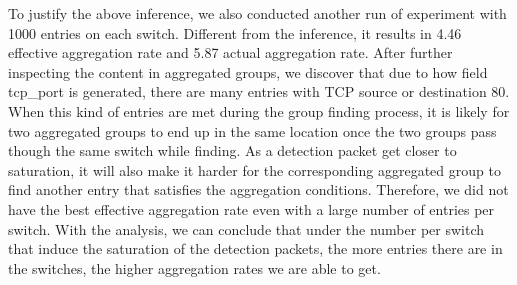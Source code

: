 To justify the above inference, we also conducted another run of experiment with 1000 entries on each switch. Different from the inference, it results in 4.46 effective aggregation rate and 5.87 actual aggregation rate. After further inspecting the content in aggregated groups, we discover that due to how field tcp\_port is generated, there are many entries with TCP source or destination 80. When this kind of entries are met during the group finding process, it is likely for two aggregated groups to end up in the same location once the two groups pass though the same switch while finding. As a detection packet get closer to saturation, it will also make it harder for the corresponding aggregated group to find another entry that satisfies the aggregation conditions. Therefore, we did not have the best effective aggregation rate even with a large number of entries per switch. With the analysis, we can conclude that under the number per switch that induce the saturation of the detection packets, the more entries there are in the switches, the higher aggregation rates we are able to get.